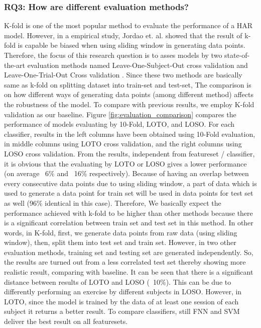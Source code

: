 \documentclass[journal,article,submit,moreauthors,pdftex]{Definitions/mdpi}
\begin{document}
\subsubsection{RQ3: How are different evaluation methods?}
K-fold is one of the most popular method to evaluate the performance of a HAR model\cite{wang2019survey}. However, in a empirical study, Jordao et. al. \cite{jordao2018human} showed that the result of k-fold is capable be biased when using sliding window in generating data points. Therefore, the focus of this research question is to asses models by two state-of-the-art evaluation methods named Leave-One-Subject-Out cross validation\cite{liu2011multisensor} and Leave-One-Trial-Out Cross validation\cite{sena2018multiscale} \cite{jordao2018human}. Since these two methods are basically same as k-fold on splitting dataset into train-set and test-set, The comparison is on how different ways of generating data points (among different method) affects the robustness of the model. To compare with previous results, we employ K-fold validation as our baseline. Figure \ref{fig:evaluation_comparison} compares the performance of models evaluating by 10-Fold, LOTO, and LOSO. For each classifier, results in the left columns have been obtained using 10-Fold evaluation, in middle columns using LOTO cross validation, and the right columns using LOSO cross validation. From the results, independent from featureset / classifier, it is obvious that the evaluating by LOTO or LOSO gives a lower performance (on average ~6\% and ~16\% respectively).
Because of having an overlap between every consecutive data points due to using sliding window, a part of data which is used to generate a data point for train set will be used in data points for test set as well (96\% identical in this case). Therefore, We basically expect the performance achieved with k-fold to be higher than other methods because there is a significant correlation between train set and test set in this method. In other words, in K-fold, first, we generate data points from raw data (using sliding window), then, split them into test set and train set. However, in two other evaluation methods, training set and testing set are generated independently. So, the results are turned out from a less correlated test set thereby showing more realistic result, comparing with baseline. It can be seen that there is a significant distance between results of LOTO and LOSO (~10\%). This can be due to differently performing an exercise by different subjects in LOSO. However, in LOTO, since the model is trained by the data of at least one session of each subject it returns a better result. To compare classifiers, still FNN and SVM deliver the best result on all featuresets.
\end{document}
